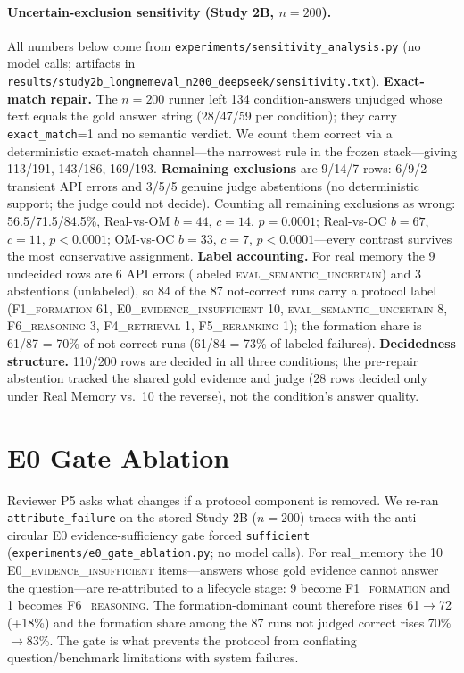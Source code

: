 \documentclass[11pt]{article}
\newcommand{\fone}{F1\textsc{\_formation}}
\newcommand{\ffour}{F4\textsc{\_retrieval}}
\newcommand{\ffive}{F5\textsc{\_reranking}}
\newcommand{\fsix}{F6\textsc{\_reasoning}}
\newcommand{\ezero}{E0\textsc{\_evidence\_insufficient}}
\newcommand{\evaluncertain}{\textsc{eval\_semantic\_uncertain}}
\begin{document}
\paragraph{Uncertain-exclusion sensitivity (Study 2B, $n{=}200$).}
All numbers below come from \texttt{experiments/sensitivity\_analysis.py}
(no model calls; artifacts in
\texttt{results/study2b\_longmemeval\_n200\_deepseek/sensitivity.txt}).
\textbf{Exact-match repair.} The $n{=}200$ runner left 134
condition-answers unjudged whose text equals the gold answer string
(28/47/59 per condition); they carry \texttt{exact\_match}=1 and no
semantic verdict. We count them correct via a deterministic
exact-match channel---the narrowest rule in the frozen stack---giving
113/191, 143/186, 169/193. \textbf{Remaining exclusions} are 9/14/7
rows: 6/9/2 transient API errors and 3/5/5 genuine judge abstentions
(no deterministic support; the judge could not decide). Counting all
remaining exclusions as wrong: 56.5/71.5/84.5\%, Real-vs-OM $b{=}44$,
$c{=}14$, $p{=}0.0001$; Real-vs-OC $b{=}67$, $c{=}11$, $p{<}0.0001$;
OM-vs-OC $b{=}33$, $c{=}7$, $p{<}0.0001$---every contrast survives the
most conservative assignment. \textbf{Label accounting.} For real
memory the 9 undecided rows are 6 API errors (labeled
\evaluncertain{}) and 3 abstentions (unlabeled), so 84 of the 87
not-correct runs carry a protocol label (\fone{} 61, \ezero{} 10,
\evaluncertain{} 8, \fsix{} 3, \ffour{} 1, \ffive{} 1); the formation
share is 61/87 = 70\% of not-correct runs (61/84 = 73\% of labeled
failures). \textbf{Decidedness structure.}
110/200 rows are decided in all three conditions; the pre-repair
abstention tracked the shared gold evidence and judge (28 rows decided
only under Real Memory vs.\ 10 the reverse), not the condition's answer
quality.

\section{E0 Gate Ablation}
\label{app:e0}

Reviewer P5 asks what changes if a protocol component is removed. We
re-ran \texttt{attribute\_failure} on the stored Study 2B ($n{=}200$)
traces with the
anti-circular E0 evidence-sufficiency gate forced \texttt{sufficient}
(\texttt{experiments/e0\_gate\_ablation.py}; no model calls). For
real\_memory the 10 \ezero{} items---answers whose gold evidence cannot
answer the question---are re-attributed to a lifecycle stage: 9 become
\fone{} and 1 becomes \fsix{}. The formation-dominant count therefore
rises 61$\to$72 (+18\%) and the formation share among the 87 runs not
judged correct rises 70\%$\to$83\%. The gate is what prevents the protocol from conflating
question/benchmark limitations with system failures.
\end{document}
